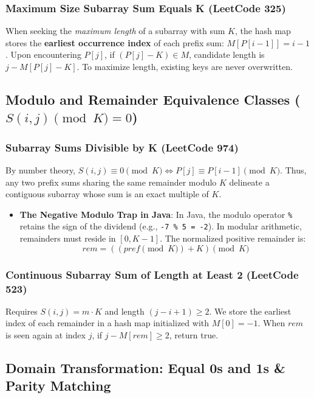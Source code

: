 \documentclass[10pt,journal,compsoc,onecolumn]{IEEEtran}
\begin{document}
\subsubsection{Maximum Size Subarray Sum Equals K (LeetCode 325)}
When seeking the \emph{maximum length} of a subarray with sum $K$, the hash map stores the \textbf{earliest occurrence index} of each prefix sum: $M[P[i-1]] = i - 1$. Upon encountering $P[j]$, if $(P[j] - K) \in M$, candidate length is $j - M[P[j] - K]$. To maximize length, existing keys are never overwritten.

\subsection{Modulo and Remainder Equivalence Classes ($S(i, j) \pmod K = 0$)}

\subsubsection{Subarray Sums Divisible by K (LeetCode 974)}
By number theory, $S(i, j) \equiv 0 \pmod K \iff P[j] \equiv P[i-1] \pmod K$.
Thus, any two prefix sums sharing the same remainder modulo $K$ delineate a contiguous subarray whose sum is an exact multiple of $K$.
\begin{itemize}
    \item \textbf{The Negative Modulo Trap in Java}: In Java, the modulo operator \texttt{\%} retains the sign of the dividend (e.g., \texttt{-7 \% 5 = -2}). In modular arithmetic, remainders must reside in $[0, K-1]$. The normalized positive remainder is:
    \begin{equation}
    rem = ((pref \pmod K) + K) \pmod K
    \end{equation}
\end{itemize}

\subsubsection{Continuous Subarray Sum of Length at Least 2 (LeetCode 523)}
Requires $S(i, j) = m \cdot K$ and length $(j - i + 1) \ge 2$. We store the earliest index of each remainder in a hash map initialized with $M[0] = -1$. When $rem$ is seen again at index $j$, if $j - M[rem] \ge 2$, return true.

\subsection{Domain Transformation: Equal 0s and 1s \& Parity Matching}
\end{document}
